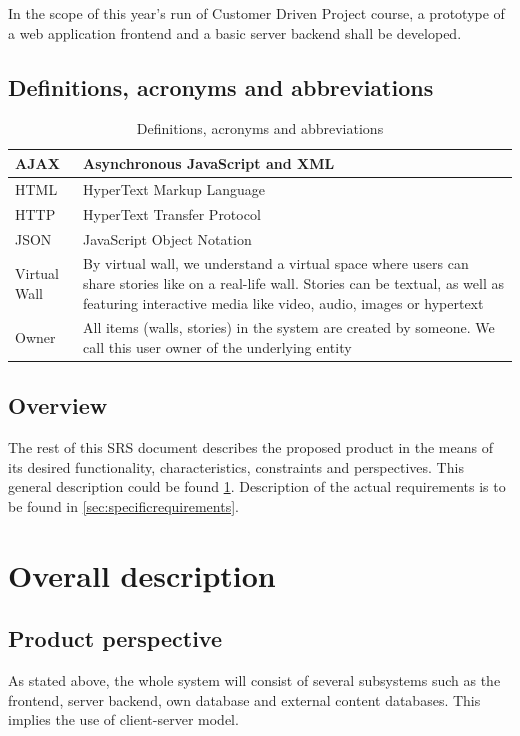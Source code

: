 \documentclass[11pt]{book}
\begin{document}
In the scope of this year's run of Customer Driven Project course, a prototype of a web application frontend and a basic server backend shall be developed.

\subsection{Definitions, acronyms and abbreviations}

\begin{table}[H]
\centering
\begin{tabular}{ l  p{11cm} }
AJAX & Asynchronous JavaScript and XML\\
\hline
HTML & HyperText Markup Language\\
\hline
HTTP & HyperText Transfer Protocol\\
\hline
JSON & JavaScript Object Notation\\
\hline
Virtual Wall & By virtual wall, we understand a virtual space where users can share stories like on a real-life wall. Stories can be textual, as well as featuring interactive media like video, audio, images or hypertext\\
\hline
Owner & All items (walls, stories) in the system are created by someone. We call this user owner of the underlying entity\\

\end{tabular}
\label{tab:requirements_definitions}
\caption{Definitions, acronyms and abbreviations}
\end{table}

\subsection{Overview}
The rest of this SRS document describes the proposed product in the means of its desired functionality, characteristics, constraints and perspectives. This general description could be found \ref{sec:overalldescription}. Description of the actual requirements is to be found in \ref{sec:specificrequirements}.

\section{Overall description}\label{sec:overalldescription}
\subsection{Product perspective}
As stated above, the whole system will consist of several subsystems such as the frontend, server backend, own database and external content databases. This implies the use of client-server model.
\end{document}

